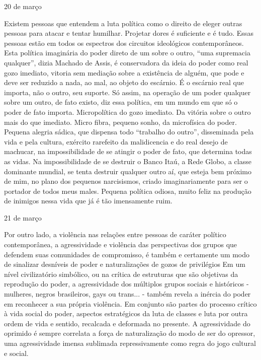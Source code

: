 \begin{flushright}
20 de março
\end{flushright}

Existem pessoas que entendem a luta política como o direito de eleger
outras pessoas para atacar e tentar humilhar. Projetar dores é
suficiente e é tudo. Essas pessoas estão em todos os espectros dos
circuitos ideológicos contemporâneos. Esta política imaginária do poder
direto de um sobre o outro, ``uma supremacia qualquer'', dizia Machado
de Assis, é conservadora da ideia do poder como real gozo imediato,
vitoria sem mediação sobre a existência de alguém, que pode e deve ser
reduzido a nada, ao mal, ao objeto do escárnio. É o escárnio real que
importa, não o outro, seu suporte. Só assim, na operação de um poder
qualquer sobre um outro, de fato existo, diz essa política, em um mundo
em que só o poder de fato importa. Micropolítica do gozo imediato. Da
vitória sobre o outro mais do que imediato. Micro fibra, pequeno sonho,
da microfísica do poder. Pequena alegria sádica, que dispensa todo
``trabalho do outro'', disseminada pela vida e pela cultura, exército
rarefeito da malidicencia e do real desejo de machucar, na
impossibilidade de se atingir o poder de fato, que determina todas as
vidas. Na impossibilidade de se destruir o Banco Itaú, a Rede Globo, a
classe dominante mundial, se tenta destruir qualquer outro aí, que
esteja bem próximo de mim, no plano dos pequenos narcisismos, criado
imaginariamente para ser o portador de todos meus males. Pequena
política odiosa, muito feliz na produção de inimigos nessa vida que já é
tão imensamente ruim.

\begin{flushright}
21 de março
\end{flushright}

Por outro lado, a violência nas relações entre pessoas de caráter
político contemporânea, a agressividade e violência das perspectivas dos
grupos que defendem suas comunidades de compromisso, é também e
certamente um modo de sinalizar desníveis de poder e naturalizações de
gozos de privilégios Em um nível civilizatório simbólico, ou na crítica
de estruturas que são objetivas da reprodução do poder, a agressividade
dos múltiplos grupos sociais e históricos - mulheres, negros
brasileiros, gays ou trans... - também revela a inércia do poder em
reconhecer a sua própria violência. Em conjunto são partes do processo
crítico à vida social do poder, aspectos estratégicos da luta de classes
e luta por outra ordem de vida e sentido, recalcada e deformada no
presente. A agressividade do oprimido é sempre correlata a força de
naturalização do modo de ser do opressor, uma agressividade imensa
sublimada repressivamente como regra do jogo cultural e social.

